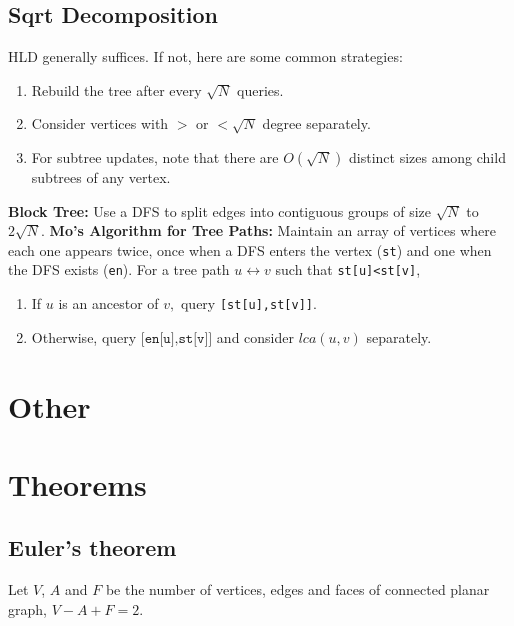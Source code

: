     \subsection{Sqrt Decomposition}
		\vspace{-0.2em}
		HLD generally suffices. If not, here are some common strategies:
		\begin{enumerate}
			\itemsep-0.8em
			\item Rebuild the tree after every $\sqrt N$ queries. 
			\item Consider vertices with $>$ or $<\sqrt N$ degree separately. 
			\item For subtree updates, note that there are $O(\sqrt N)$ distinct sizes among child subtrees of any vertex.
		\end{enumerate}
		\textbf{Block Tree:} Use a DFS to split edges into contiguous groups of size $\sqrt N$ to $2\sqrt N.$
		\textbf{Mo's Algorithm for Tree Paths:} Maintain an array of vertices where each one appears twice, once when a DFS enters the vertex (\texttt{st}) and one when the DFS exists (\texttt{en}). For a tree path $u\leftrightarrow v$ such that \texttt{st[u]<st[v]},
		\begin{enumerate}
			\itemsep-0.8em
			\item If $u$ is an ancestor of $v,$ query \texttt{[st[u],st[v]]}.
			\item Otherwise, query $\texttt{[en[u],st[v]]}$ and consider $lca(u,v)$ separately.
		\end{enumerate}
    
\section{Other}


\section{Theorems}
\subsection{Euler's theorem}
Let $V$, $A$ and $F$ be the number of vertices, edges and faces of connected planar graph, $V - A + F = 2$.\\

